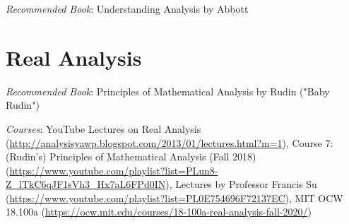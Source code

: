 \documentclass[openany,10pt]{book}
\begin{document}
\textit{Recommended Book}: Understanding Analysis by Abbott\newline


\chapter{Real Analysis}

\textit{Recommended Book}: Principles of Mathematical Analysis by Rudin ("Baby Rudin")\newline

\noindent \textit{Courses}: YouTube Lectures on Real Analysis (\url{http://analysisyawp.blogspot.com/2013/01/lectures.html?m=1}), Course 7: (Rudin's) Principles of Mathematical Analysis (Fall 2018) (\url{https://www.youtube.com/playlist?list=PLun8-Z_lTkC6qJF1sVh3_Hx7aL6FPd0IN}), Lectures by Professor Francis Su (\url{https://www.youtube.com/playlist?list=PL0E754696F72137EC}), MIT OCW 18.100a (\url{https://ocw.mit.edu/courses/18-100a-real-analysis-fall-2020/})\newline
\end{document}
